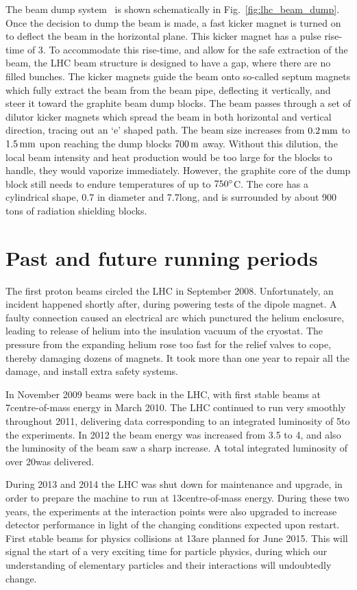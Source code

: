 The beam dump system~\cite{Schmidt:2006mi} is shown schematically in Fig.~\ref{fig:lhc_beam_dump}. 
Once the decision to dump the beam is made, a fast kicker magnet is turned on to deflect the beam
in the horizontal plane. 
This kicker magnet has a pulse rise-time of 3\mus. To accommodate this rise-time, and allow for
the safe extraction of the beam, the LHC beam structure is designed to have a gap, where there are
no filled bunches.
The kicker magnets guide the beam onto so-called septum magnets which fully extract the beam from
the beam pipe, deflecting it vertically, and steer it toward the graphite beam dump blocks. The
beam passes through a set of dilutor kicker magnets which spread the beam in both horizontal and
vertical direction, tracing out an `e' shaped path. 
The beam size increases from $0.2\mm$ to $1.5\mm$ upon reaching the dump blocks $700\meter$ away.
Without this dilution, the local beam intensity and heat production would be too large for the
blocks to handle, they would vaporize immediately. However, the graphite core of the dump block
still needs to endure temperatures of up to $750\de$C. The core has a cylindrical shape, 0.7\meter
in diameter and 7.7\meter long, and is surrounded by about 900 tons of radiation shielding blocks.


\section{Past and future running periods}

The first proton beams circled the LHC in September 2008. Unfortunately, an incident happened
shortly after, during powering tests of the dipole magnet. A faulty connection caused  an electrical
arc which punctured the helium enclosure, leading to release of helium into the insulation vacuum of
the cryostat. The pressure from the expanding helium rose too fast for the relief valves to cope,
thereby damaging dozens of magnets. It took more than one year to repair all the damage, and
install extra safety systems. 

In November 2009 beams were back in the LHC, with first stable beams
at 7\TeV centre-of-mass energy in March 2010. The LHC continued to run very smoothly throughout
2011, delivering data corresponding to an integrated luminosity of 5\fbinv to the experiments.  
In 2012 the beam energy was increased from 3.5 to 4\TeV, and also the luminosity of the beam saw a
sharp increase. A total integrated luminosity of over 20\fbinv was delivered. 

During 2013 and 2014 the LHC was shut down for maintenance and upgrade, in order to prepare the
machine to run at 13\TeV centre-of-mass energy. During these two years, the experiments at the
interaction points were also upgraded to increase detector performance in light of the changing
conditions expected upon restart. 
First stable beams for physics collisions at 13\TeV are planned for June 2015. This will signal the
start of a very exciting time for particle physics, during which our understanding of elementary
particles and their interactions will undoubtedly change. 


